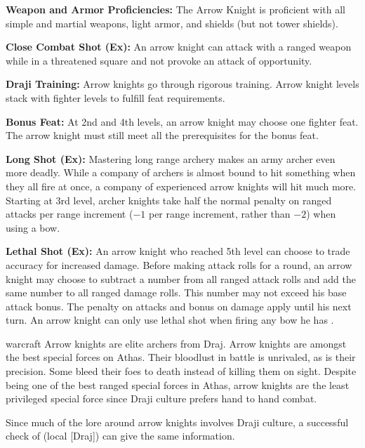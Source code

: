 {
\textbf{Weapon and Armor Proficiencies:} The Arrow Knight is proficient with all simple and martial weapons, light armor, and shields (but not tower shields).

\textbf{Close Combat Shot (Ex):} An arrow knight can attack with a ranged weapon while in a threatened square and not provoke an attack of opportunity.

\textbf{Draji Training:} Arrow knights go through rigorous training. Arrow knight levels stack with fighter levels to fulfill feat requirements.

\textbf{Bonus Feat:} At 2nd and 4th levels, an arrow knight may choose one fighter feat. The arrow knight must still meet all the prerequisites for the bonus feat.

\textbf{Long Shot (Ex):} Mastering long range archery makes an army archer even more deadly. While a company of archers is almost bound to hit something when they all fire at once, a company of experienced arrow knights will hit much more. Starting at 3rd level, archer knights take half the normal penalty on ranged attacks per range increment ($-1$ per range increment, rather than $-2$) when using a bow.

\textbf{Lethal Shot (Ex):} An arrow knight who reached 5th level can choose to trade accuracy for increased damage. Before making attack rolls for a round, an arrow knight may choose to subtract a number from all ranged attack rolls and add the same number to all ranged damage rolls. This number may not exceed his base attack bonus. The penalty on attacks and bonus on damage apply until his next turn. An arrow knight can only use lethal shot when firing any bow he has .
}
{}
{warcraft}
{Arrow knights are elite archers from Draj.}
{Arrow knights are amongst the best special forces on Athas. Their bloodlust in battle is unrivaled, as is their precision. Some bleed their foes to death instead of killing them on sight.}
{Despite being one of the best ranged special forces in Athas, arrow knights are the least privileged special force since Draji culture prefers hand to hand combat.}

Since much of the lore around arrow knights involves Draji culture, a successful check of  (local [Draj]) can give the same information.